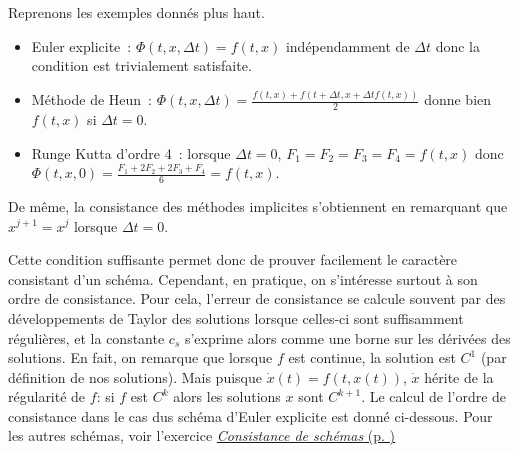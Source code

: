 \hypertarget{ed2-ex_consistance}{}
\begin{exemple}\label{ed2-ex_consistance}
Reprenons les exemples donnés plus haut.

\begin{itemize}
\item
  Euler explicite~: \(\Phi(t,x,{\Delta t})= f(t,x)\) indépendamment de
  \({\Delta t}\) donc la condition est trivialement satisfaite.
\item
  Méthode de Heun~:
  \(\Phi(t,x,{\Delta t}) = \frac{f(t,x) + f(t+{\Delta t},x+{\Delta t}f(t,x))}{2}\)
  donne bien \(f(t,x)\) si \({\Delta t}=0\).
\item
  Runge Kutta d'ordre 4~: lorsque \({\Delta t}=0\),
  \(F_1=F_2=F_3=F_4=f(t,x)\) donc
  \(\Phi(t,x,0) = \frac{F_1+2F_2+2F_3+F_4}{6}=f(t,x)\).
\end{itemize}

De même, la consistance des méthodes implicites s'obtiennent en
remarquant que \(x^{j+1}=x^{j}\) lorsque \({\Delta t}=0\).

Cette condition suffisante permet donc de prouver facilement le
caractère consistant d'un schéma. Cependant, en pratique, on s'intéresse
surtout à son ordre de consistance. Pour cela, l'erreur de consistance
se calcule souvent par des développements de Taylor des solutions
lorsque celles-ci sont suffisamment régulières, et la constante \(c_s\)
s'exprime alors comme une borne sur les dérivées des solutions. En fait,
on remarque que lorsque \(f\) est continue, la solution est \(C^1\) (par
définition de nos solutions). Mais puisque \(\dot{x}(t)=f(t,x(t))\),
\(\dot{x}\) hérite de la régularité de \(f\): si \(f\) est \(C^k\) alors
les solutions \(x\) sont \(C^{k+1}\). Le calcul de l'ordre de
consistance dans le cas dus schéma d'Euler explicite est donné
ci-dessous. Pour les autres schémas, voir l'exercice
\protect\hyperlink{ed2-exo_consist}{\emph{Consistance de schémas} (p.
\pageref*{ed2-exo_consist})}
\end{exemple}

